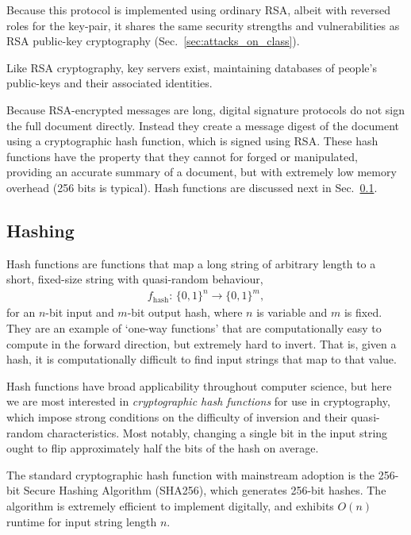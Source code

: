Because this protocol is implemented using ordinary RSA, albeit with reversed roles for the key-pair, it shares the same security strengths and vulnerabilities as RSA public-key cryptography (Sec.~\ref{sec:attacks_on_class}).

Like RSA cryptography, key servers exist, maintaining databases of people's public-keys and their associated identities.

Because RSA-encrypted messages are long, digital signature protocols do not sign the full document directly. Instead they create a message digest of the document using a cryptographic hash function, which is signed using RSA. These hash functions have the property that they cannot for forged or manipulated, providing an accurate summary of a document, but with extremely low memory overhead (256 bits is typical). Hash functions are discussed next in Sec.~\ref{sec:hashing}.

%
%

\subsection{Hashing} \label{sec:hashing} 

Hash functions are functions that map a long string of arbitrary length to a short, fixed-size string with quasi-random behaviour,
\begin{align}
	f_\mathrm{hash}:\,\{0,1\}^n \to \{0,1\}^m,
\end{align}
for an $n$-bit input and $m$-bit output hash, where $n$ is variable and $m$ is fixed. They are an example of `one-way functions' that are computationally easy to compute in the forward direction, but extremely hard to invert. That is, given a hash, it is computationally difficult to find input strings that map to that value.

Hash functions have broad applicability throughout computer science, but here we are most interested in \textit{cryptographic hash functions} for use in cryptography, which impose strong conditions on the difficulty of inversion and their quasi-random characteristics. Most notably, changing a single bit in the input string ought to flip approximately half the bits of the hash on average.

The standard cryptographic hash function with mainstream adoption is the 256-bit Secure Hashing Algorithm (SHA256), which generates 256-bit hashes. The algorithm is extremely efficient to implement digitally, and exhibits $O(n)$ runtime for input string length $n$.

